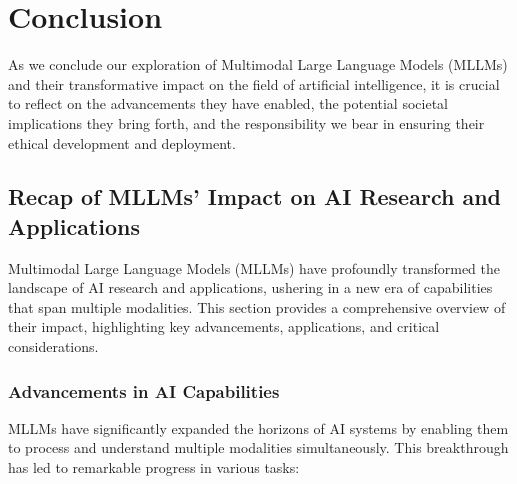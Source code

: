 \chapter{Conclusion}




As we conclude our exploration of Multimodal Large Language Models (MLLMs) and their transformative impact on the field of artificial intelligence, it is crucial to reflect on the advancements they have enabled, the potential societal implications they bring forth, and the responsibility we bear in ensuring their ethical development and deployment.

\section{Recap of MLLMs' Impact on AI Research and Applications}

Multimodal Large Language Models (MLLMs) have profoundly transformed the landscape of AI research and applications, ushering in a new era of capabilities that span multiple modalities. This section provides a comprehensive overview of their impact, highlighting key advancements, applications, and critical considerations.

\subsection{Advancements in AI Capabilities}

MLLMs have significantly expanded the horizons of AI systems by enabling them to process and understand multiple modalities simultaneously. This breakthrough has led to remarkable progress in various tasks:

